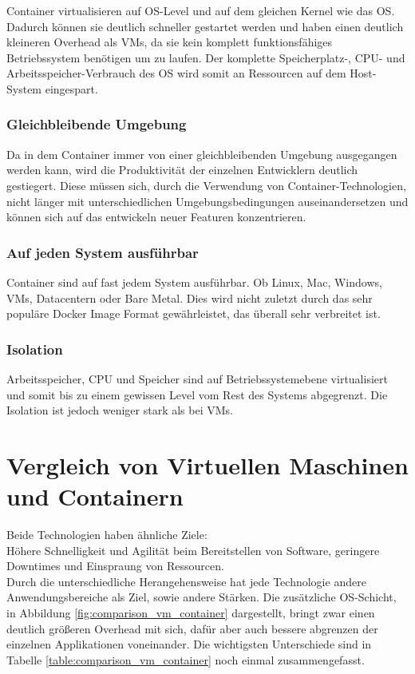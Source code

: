 Container virtualisieren auf \ac{OS}-Level und auf dem gleichen Kernel wie das \ac{OS}.
Dadurch können sie deutlich schneller gestartet werden und haben einen deutlich kleineren Overhead als \ac{VM}s, da sie kein komplett funktionsfähiges Betriebssystem benötigen um zu laufen.
Der komplette Speicherplatz-, CPU- und Arbeitsspeicher-Verbrauch des \ac{OS} wird somit an Ressourcen auf dem Host-System eingespart.

\subsubsection{Gleichbleibende Umgebung}
Da in dem Container immer von einer gleichbleibenden Umgebung ausgegangen werden kann, wird die Produktivität der einzelnen Entwicklern deutlich gestiegert.
Diese müssen sich, durch die Verwendung von Container-Technologien, nicht länger mit unterschiedlichen Umgebungsbedingungen auseinandersetzen und können sich auf das entwickeln neuer Featuren konzentrieren.

\subsubsection{Auf jeden System ausführbar}
Container sind auf fast jedem System ausführbar. 
Ob Linux, Mac, Windows, \ac{VM}s, Datacentern oder Bare Metal.
Dies wird nicht zuletzt durch das sehr populäre Docker Image Format gewährleistet, das überall sehr verbreitet ist. 

\subsubsection{Isolation}
Arbeitsspeicher, CPU und Speicher sind auf Betriebssystemebene virtualisiert und somit bis zu einem gewissen Level vom Rest des Systems abgegrenzt. 
Die Isolation ist jedoch weniger stark als bei \ac{VM}s.



\section{Vergleich von Virtuellen Maschinen und Containern}

Beide Technologien haben ähnliche Ziele: \\
Höhere Schnelligkeit und Agilität beim Bereitstellen von Software, geringere Downtimes und Einspraung von Ressourcen. \\
Durch die unterschiedliche Herangehensweise hat jede Technologie andere Anwendungsbereiche als Ziel, sowie andere Stärken.
Die zusätzliche \ac{OS}-Schicht, in Abbildung \ref{fig:comparison_vm_container} dargestellt, bringt zwar einen deutlich größeren Overhead mit sich, dafür aber auch bessere abgrenzen der einzelnen Applikationen voneinander.
Die wichtigsten Unterschiede sind in Tabelle \ref{table:comparison_vm_container} noch einmal zusammengefasst. 

